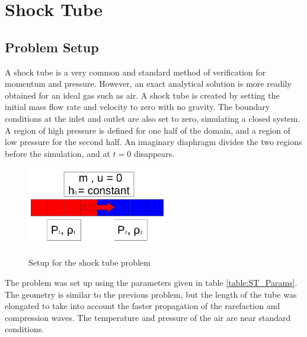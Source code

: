 \vspace*{-80mm}
\chapter{Shock Tube} \label{chapter5:Shock_Tube}
 
	\section{Problem Setup} \label{Verification:Shock_Tube}
        
    A shock tube is a very common and standard method of verification for
    momentum and pressure. However, an exact analytical solution is more readily
    obtained for an ideal gas such as air. A shock tube is created by setting
    the initial mass flow rate and velocity to zero with no gravity. The
    boundary conditions at the inlet and outlet are also set to zero, simulating
    a closed system. A region of high pressure is defined for one half of the
    domain, and a region of low pressure for the second half. An imaginary
    diaphragm divides the two regions before the simulation, and at $t=0$
    disappears.
    
    \begin{figure}[!h]
    	\centering
    	\includegraphics[width=0.55\textwidth]{images/Verification_Problem2_shock_tube}
    	\label{fig:Verification_2}
    	\caption{Setup for the shock tube problem}
    \end{figure}
    
    The problem was set up using the parameters given in table
    \ref{table:ST_Params}. The geometry is similar to the previous problem, but
    the length of the tube was elongated to take into account the faster
    propagation of the rarefaction and compression waves. The temperature and
    pressure of the air are near standard conditions.
    
